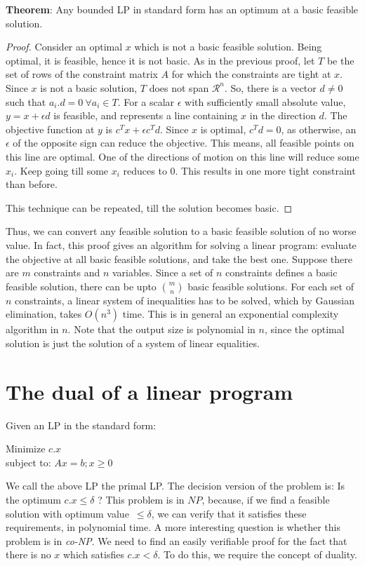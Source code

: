 \documentclass[11pt]{article}
\begin{document}
\textbf{Theorem}:
Any bounded LP in standard form has an optimum at a basic feasible solution.

\begin{proof}
Consider an optimal $x$ which is not a basic feasible solution. Being optimal, it is feasible, hence it is not basic. As in the previous proof, let $T$ be the set of rows of the constraint matrix $A$ for which the constraints are tight at $x$. Since $x$ is not a basic solution, $T$ does not span ${\mathcal R}^n$. So, there is a vector $d \neq 0$ such that $a_i.d = 0\ \forall a_i \in T$. For a scalar $\epsilon$ with sufficiently small absolute value, $y=x+\epsilon d$ is feasible, and represents a line containing $x$ in the direction $d$. The objective function at $y$ is $c^Tx+\epsilon c^Td$. Since $x$ is optimal, $c^Td=0$, as otherwise, an $\epsilon$ of the opposite sign can reduce the objective. This means, all feasible points on this line are optimal. One of the directions of motion on this line will reduce some $x_i$. Keep going till some $x_i$ reduces to 0. This results in one more tight constraint than before.

This technique can be repeated, till the solution becomes basic.
\end{proof}

Thus,  we can convert any feasible solution to a basic feasible solution of no worse value. In fact, this proof gives an algorithm for solving a linear program: evaluate the objective at all basic feasible solutions, and take the best one. Suppose there are $m$ constraints and $n$ variables. Since a set of $n$ constraints defines a basic feasible solution, there can be upto $m \choose n$ basic feasible solutions. For each set of $n$ constraints, a linear system of inequalities has to be solved, which by Gaussian elimination, takes $O(n^3)$ time. This is in general an exponential complexity algorithm in $n$.
Note that the output size is polynomial in $n$, since the optimal solution is just the solution of a system of linear equalities.

\section{The dual of a linear program}
Given an LP in the standard form:
\begin{center}
Minimize $c.x$\\ subject to: $Ax=b; x \geq 0$
\end{center}
We call the above LP the primal LP. The decision version of the problem is: Is the optimum $c.x \leq \delta$ ? This problem is in $NP$, because, if we find a feasible solution with optimum value~$\leq \delta$, we can verify that it satisfies these requirements, in polynomial time. A more interesting question is whether this problem is in \emph{co-NP}.  We need to find an easily verifiable proof for the fact that there is no $x$ which satisfies $c.x < \delta$. To do this, we require the concept of duality.
\end{document}
